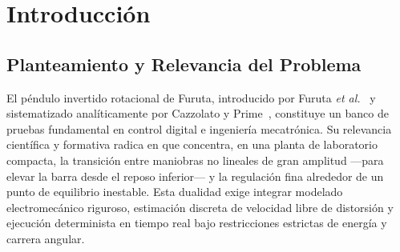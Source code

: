 \section{Introducción}\label{sec:introduccion}

\subsection{Planteamiento y Relevancia del Problema}
El péndulo invertido rotacional de Furuta, introducido por Furuta \textit{et al.}~\cite{furuta1991} y sistematizado analíticamente por Cazzolato y Prime~\cite{cazzolato2011}, constituye un banco de pruebas fundamental en control digital e ingeniería mecatrónica. Su relevancia científica y formativa radica en que concentra, en una planta de laboratorio compacta, la transición entre maniobras no lineales de gran amplitud ---para elevar la barra desde el reposo inferior--- y la regulación fina alrededor de un punto de equilibrio inestable. Esta dualidad exige integrar modelado electromecánico riguroso, estimación discreta de velocidad libre de distorsión y ejecución determinista en tiempo real bajo restricciones estrictas de energía y carrera angular.

